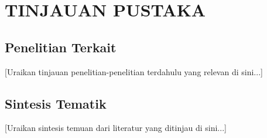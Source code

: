 \section{TINJAUAN PUSTAKA}
\label{sec:tinjauan-pustaka}

\subsection{Penelitian Terkait}
[Uraikan tinjauan penelitian-penelitian terdahulu yang relevan di sini...]

\subsection{Sintesis Tematik}
[Uraikan sintesis temuan dari literatur yang ditinjau di sini...]
